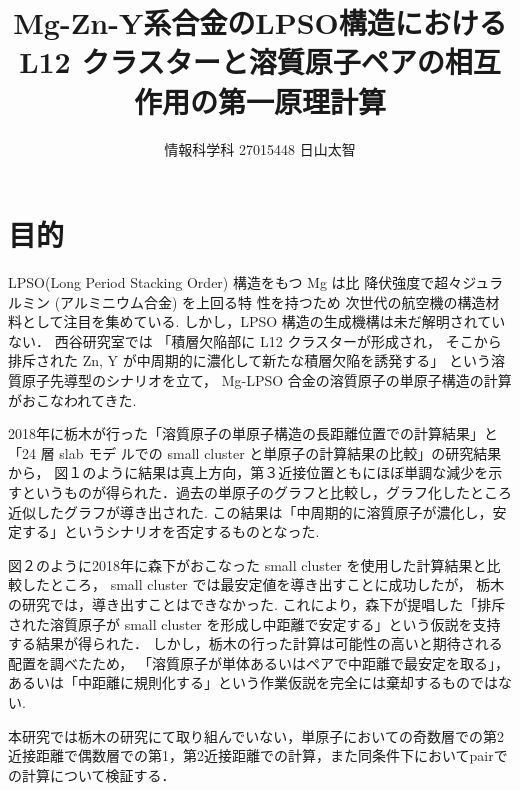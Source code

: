 \documentclass[a4j,twocolumn]{jsarticle}
\begin{document}
\title{Mg-Zn-Y系合金のLPSO構造におけるL12 クラスターと溶質原子ペアの相互作用の第一原理計算}
\author{情報科学科 \hspace{5mm} 27015448 \hspace{5mm} 日山太智}
\date{}
\maketitle

\section{目的}


LPSO(Long Period Stacking Order) 構造をもつ 
Mg は比 降伏強度で超々ジュラルミン (アルミニウム合金) を上回る特 性を持つため
次世代の航空機の構造材料として注目を集めている.
しかし，LPSO 構造の生成機構は未だ解明されていない．
西谷研究室では
「積層欠陥部に L12 クラスターが形成され，
そこから排斥された Zn, Y が中周期的に濃化して新たな積層欠陥を誘発する」
という溶質原子先導型のシナリオを立て，
Mg-LPSO 合金の溶質原子の単原子構造の計算がおこなわれてきた.

2018年に栃木が行った「溶質原子の単原子構造の長距離位置での計算結果」と「24 層 slab モデ ルでの small cluster と単原子の計算結果の比較」の研究結果から，
図１のように結果は真上方向，第３近接位置ともにほぼ単調な減少を示すというものが得られた．過去の単原子のグラフと比較し，グラフ化したところ近似したグラフが導き出された.
この結果は「中周期的に溶質原子が濃化し，安定する」というシナリオを否定するものとなった\cite{tochigi}.

図２のように2018年に森下がおこなった small cluster を使用した計算結果と比較したところ，
small cluster では最安定値を導き出すことに成功したが，
栃木の研究では，導き出すことはできなかった.
これにより，森下が提唱した「排斥された溶質原子が small cluster を形成し中距離で安定する」という仮説を支持する結果が得られた\cite{donkey}．
しかし，栃木の行った計算は可能性の高いと期待される配置を調べたため，
「溶質原子が単体あるいはペアで中距離で最安定を取る」，あるいは「中距離に規則化する」という作業仮説を完全には棄却するものではない\cite{tochigi}.

本研究では栃木の研究にて取り組んでいない，単原子においての奇数層での第2近接距離で偶数層での第1，第2近接距離での計算，また同条件下においてpairでの計算について検証する．
\end{document}
